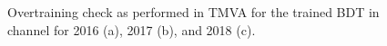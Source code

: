 \begin{figure}[htbp]
  \centering
  \caption{Overtraining check as performed in TMVA for the trained BDT in \emu channel for 2016 (a), 2017 (b), and 2018 (c).}
  \label{fig:etaumu_bdttrain}
\end{figure}
